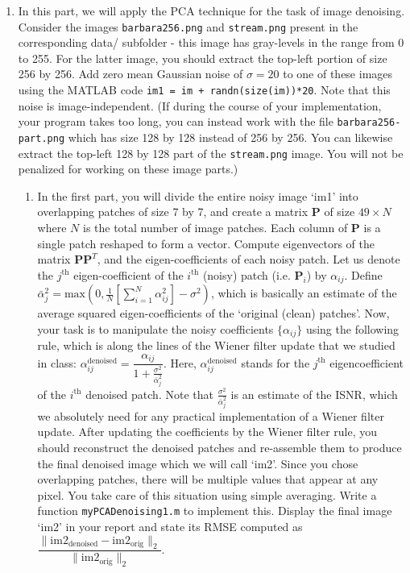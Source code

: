 \documentclass[11pt]{article}
\begin{document}
\begin{enumerate}
\item In this part, we will apply the PCA technique for the task of image denoising. Consider the images \texttt{barbara256.png} and \texttt{stream.png} present in the corresponding data/ subfolder - this image has gray-levels in the range from 0 to 255. For the latter image, you should extract the top-left portion of size 256 by 256. Add zero mean Gaussian noise of $\sigma = 20$ to one of these images using the MATLAB code \texttt{im1 = im + randn(size(im))*20}. Note that this noise is image-independent. (If during the course of your implementation, your program takes too long, you can instead work with the file \texttt{barbara256-part.png} which has size 128 by 128 instead of 256 by 256. You can likewise extract the top-left 128 by 128 part of the \texttt{stream.png} image. You will not be penalized for working on these image parts.)
\begin{enumerate}
\item In the first part, you will divide the entire noisy image `im1' into overlapping patches of size 7 by 7, and create a matrix $\mathbf{P}$ of size $49 \times N$ where $N$ is the total number of image patches. Each column of $\mathbf{P}$ is a single patch reshaped to form a vector. Compute eigenvectors of the matrix $\mathbf{PP}^T$, and the eigen-coefficients of each noisy patch. 
Let us denote the $j^{\textrm{th}}$ eigen-coefficient of the $i^{\textrm{th}}$ (noisy) patch (i.e. $\mathbf{P}_i$) by $\alpha_{ij}$. Define $\bar{\alpha}^2_j = \textrm{max}(0,\frac{1}{N}[\sum_{i=1}^N \alpha^2_{ij}] - \sigma^2)$, which is basically an estimate of the average squared eigen-coefficients of the `original (clean) patches'. Now, your task is to manipulate the noisy coefficients $\{\alpha_{ij}\}$ using the following rule, which is along the lines of the Wiener filter update that we studied in class:
$\alpha^{\textrm{denoised}}_{ij} = \dfrac{\alpha_{ij}}{1 + \frac{\sigma^2}{\bar{\alpha}^2_j}}$.
Here, $\alpha^{\textrm{denoised}}_{ij}$ stands for the $j^{\textrm{th}}$ eigencoefficient of the $i^{\textrm{th}}$ denoised patch. Note that $\frac{\sigma^2}{\bar{\alpha}^2_j}$ is an estimate of the ISNR, which we absolutely need for any practical implementation of a Wiener filter update.  After updating the coefficients by the Wiener filter rule, you should reconstruct the denoised patches and re-assemble them to produce the final denoised image which we will call `im2'. Since you chose overlapping patches, there will be multiple values that appear at any pixel. You take care of this situation using simple averaging. Write a function \texttt{myPCADenoising1.m} to implement this. Display the final image `im2' in your report and state its RMSE computed as $\dfrac{\|\textrm{im2}_\textrm{denoised}-\textrm{im2}_\textrm{orig}\|_2}{\|\textrm{im2}_\textrm{orig}\|_2}$. 

\end{enumerate}
\end{enumerate}
\end{document}
